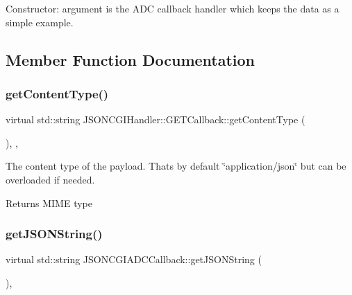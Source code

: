 Constructor\+: argument is the A\+DC callback handler which keeps the data as a simple example. 

\subsection{Member Function Documentation}
\mbox{\label{classJSONCGIHandler_1_1GETCallback_a4e1fee495ddeb4e24eaa5b8e767ea838}} 
\subsubsection{\texorpdfstring{get\+Content\+Type()}{getContentType()}}
{\footnotesize\ttfamily virtual std\+::string J\+S\+O\+N\+C\+G\+I\+Handler\+::\+G\+E\+T\+Callback\+::get\+Content\+Type (\begin{DoxyParamCaption}{ }\end{DoxyParamCaption})\hspace{0.3cm}{\ttfamily [inline]}, {\ttfamily [virtual]}, {\ttfamily [inherited]}}

The content type of the payload. That\textquotesingle{}s by default \char`\"{}application/json\char`\"{} but can be overloaded if needed. \begin{DoxyReturn}{Returns}
M\+I\+ME type 
\end{DoxyReturn}
\mbox{\label{classJSONCGIADCCallback_a763ae66809e399f49e712a1ad68289bb}} 
\subsubsection{\texorpdfstring{get\+J\+S\+O\+N\+String()}{getJSONString()}}
{\footnotesize\ttfamily virtual std\+::string J\+S\+O\+N\+C\+G\+I\+A\+D\+C\+Callback\+::get\+J\+S\+O\+N\+String (\begin{DoxyParamCaption}{ }\end{DoxyParamCaption})\hspace{0.3cm}{\ttfamily [inline]}, {\ttfamily [virtual]}}

